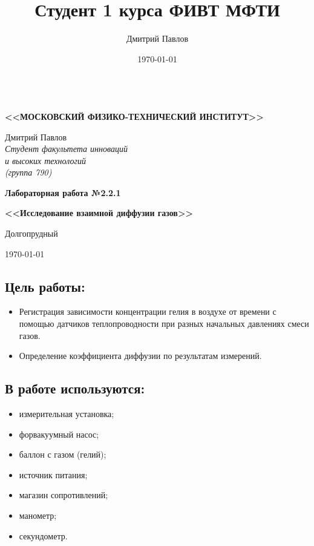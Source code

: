 \documentclass[a4paper,12pt]{article}
\author{Дмитрий Павлов}
\title{Студент 1 курса ФИВТ МФТИ}
\date{\today}
\theoremstyle{plain} %
\theoremstyle{definition} %
\theoremstyle{remark} %
\begin{document}

\thispagestyle{empty}
\begin{center}
	\vspace{0.5ex}
	
	\textbf{ \\ \MakeTextUppercase{<<Московский Физико-технический институт>>}}
\end{center}
\vspace{13ex}
\begin{flushright}
	\noindent
	{Дмитрий Павлов}
	\\
	\textit{Студент факультета инноваций\\ и высоких технологий\\(группа 790)}
\end{flushright}
\begin{center}
	\vspace{23ex}
	{\LARGE\textbf{Лабораторная работа №2.2.1}}
	\vspace{1ex}
		
	\textbf{\large{<<Исследование взаимной диффузии газов>>}}
	
	\vfill
	Долгопрудный 
	
	{\today}
\end{center}

\newpage
\subsection{Цель работы:} 
\begin{itemize}
    \item
    Регистрация зависимости концентрации гелия в воздухе от времени с помощью датчиков теплопроводности при разных начальных давлениях смеси газов.
    
    \item
    Определение коэффициента диффузии по результатам измерений.
\end{itemize} 

\subsection{В работе используются:} 
\begin{itemize}
    \item
    измерительная установка; 
    
    \item
    форвакуумный насос;
    
    \item
    баллон с газом (гелий);
    
    \item
    источник питания;
    
    \item
    магазин сопротивлений;
    
    \item
    манометр;
    
    \item
    секундометр.
\end{itemize}     
\end{document}
